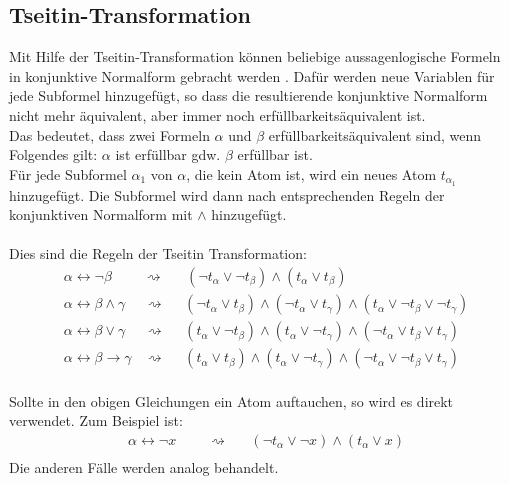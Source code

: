 \documentclass[a4,abstract=on]{scrartcl}
\begin{document}
\subsection{Tseitin-Transformation}
Mit Hilfe der Tseitin-Transformation können beliebige aussagenlogische Formeln in konjunktive Normalform gebracht werden \cite [vgl.][]{tseitin}. Dafür werden neue Variablen für jede Subformel hinzugefügt, so dass die resultierende konjunktive Normalform nicht mehr äquivalent, aber immer noch erfüllbarkeitsäquivalent ist. \\
Das bedeutet, dass zwei Formeln $\alpha$ und $\beta$ erfüllbarkeitsäquivalent sind, wenn Folgendes gilt:
$\alpha$ ist erfüllbar gdw. $\beta$ erfüllbar ist.
\ \\
Für jede Subformel $\alpha_1$ von $\alpha$, die kein Atom ist, wird ein neues Atom $t_{\alpha_1}$ hinzugefügt. Die Subformel wird dann nach entsprechenden Regeln der konjunktiven Normalform mit $\wedge$ hinzugefügt.\\
\ \\
Dies sind die Regeln der Tseitin Transformation:
\begin{align*}
&\alpha \leftrightarrow\neg \beta {~~~~~~~~~~}\rightsquigarrow{~~~~~~~} (\neg t_\alpha \vee \neg t_{\beta }) \wedge (t_\alpha \vee t_{\beta})\\
&\alpha \leftrightarrow \beta \wedge \gamma {~~~~~~}\rightsquigarrow{~~~~~~} (\neg t_\alpha \vee  t_{\beta}) \wedge (\neg t_\alpha \vee t_{\gamma}) \wedge (t_\alpha \vee \neg t_{\beta} \vee \neg t_{\gamma})\\
&\alpha \leftrightarrow \beta \vee \gamma {~~~~~~}\rightsquigarrow{~~~~~~} (t_\alpha \vee  \neg t_{\beta}) \wedge (t_\alpha \vee \neg t_{\gamma}) \wedge (\neg t_\alpha \vee t_{\beta} \vee t_{\gamma})\\
&\alpha \leftrightarrow \beta \rightarrow \gamma {~~~~}\rightsquigarrow{~~~~~~} (t_\alpha \vee  t_{\beta}) \wedge (t_\alpha \vee \neg t_{\gamma}) \wedge (\neg t_\alpha \vee \neg t_{\beta} \vee t_{\gamma})
\end{align*}
\ \\
Sollte in den obigen Gleichungen ein Atom auftauchen, so wird es direkt verwendet. Zum Beispiel ist:\\
\begin{align*}
&\alpha \leftrightarrow\neg x {~~~~~~~~~~}\rightsquigarrow{~~~~~~~} (\neg t_\alpha \vee \neg x) \wedge (t_\alpha \vee x)\\
\end{align*}
Die anderen Fälle werden analog behandelt.\\
\end{document}
